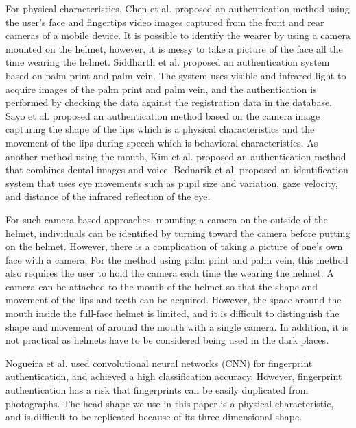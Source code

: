 \documentclass[sigchi,authordraft]{acmart}
\begin{document}
For physical characteristics, Chen et al.\cite{face_and_finger} proposed an authentication method using the user's face and fingertips video images captured from the front and rear cameras of a mobile device. It is possible to identify the wearer by using a camera mounted on the helmet, however, it is messy to take a picture of the face all the time wearing the helmet. 
Siddharth et al.\cite{palm_print} proposed an authentication system based on palm print and palm vein. The system uses visible and infrared light to acquire images of the palm print and palm vein, and the authentication is performed by checking the data against the registration data in the database. 
Sayo et al.\cite{lip_motion} proposed an authentication method based on the camera image capturing the shape of the lips which is a physical characteristics and the movement of the lips during speech which is behavioral characteristics. 
As another method using the mouth, Kim et al.\cite{teeth_and_voice} proposed an authentication method that combines dental images and voice. Bednarik et al.\cite{eye_movement} proposed an identification system that uses eye movements such as pupil size and variation, gaze velocity, and distance of the infrared reflection of the eye. 

For such camera-based approaches, mounting a camera on the outside of the helmet, individuals can be identified by turning toward the camera before putting on the helmet. However, there is a complication of taking a picture of one's own face with a camera. For the method using palm print and palm vein, this method also requires the user to hold the camera each time the wearing the helmet. A camera can be attached to the mouth of the helmet so that the shape and movement of the lips and teeth can be acquired. However, the space around the mouth inside the full-face helmet is limited, and it is difficult to distinguish the shape and movement of around the mouth with a single camera. In addition, it is not practical as helmets have to be considered being used in the dark places.

Nogueira et al.\cite{finger_CNN} used convolutional neural networks (CNN) for fingerprint authentication, and achieved a high classification accuracy. However, fingerprint authentication has a risk that fingerprints can be easily duplicated from photographs. The head shape we use in this paper is a physical characteristic, and is difficult to be replicated because of its three-dimensional shape.\par
\end{document}
